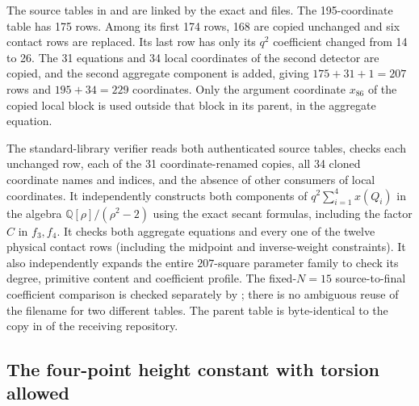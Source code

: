 \documentclass[11pt,a4paper]{article}
\newcommand{\Q}{\mathbb Q}\newcommand{\Z}{\mathbb Z}
\begin{document}
The source tables in
and  are linked by the exact
 and  files.
The 195-coordinate table has 175 rows. Among its first 174 rows,
168 are copied unchanged and six contact rows are replaced. Its last
row has only its $q^2$ coefficient changed from 14 to 26.
The 31 equations and 34 local coordinates of the second detector
are copied, and the second aggregate component is added, giving
$175+31+1=207$ rows and $195+34=229$ coordinates.
Only the argument coordinate $x_{86}$ of the copied local block is
used outside that block in its parent, in the aggregate equation.

The standard-library verifier  reads both
authenticated source tables, checks each unchanged row, each of the
31 coordinate-renamed copies, all 34 cloned coordinate names and
indices, and the absence of other consumers of local coordinates.
It independently constructs both components of
$q^2\sum_{i=1}^4x(Q_i)$ in the algebra
$\Q[\rho]/(\rho^2-2)$ using the exact secant formulas, including the
factor $C$ in $f_3,f_4$. It checks both aggregate equations and
every one of the twelve physical contact rows (including the
midpoint and inverse-weight constraints). It also independently
expands the entire $207$-square parameter family to check its
degree, primitive content and coefficient profile.
The fixed-$N=15$ source-to-final coefficient comparison is checked
separately by ; there is no ambiguous reuse of the
filename  for two different tables.
The parent table is byte-identical to the copy in
of the receiving repository.

\subsection{The four-point height constant with torsion allowed}
\label{sec:sum-height-audit}
\end{document}

